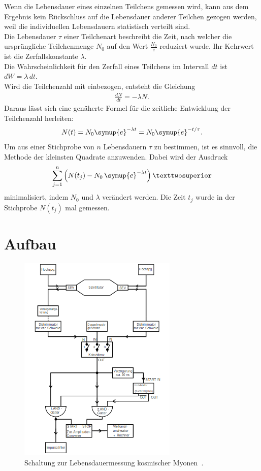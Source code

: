     Wenn die Lebensdauer eines einzelnen Teilchens gemessen wird,
    kann aus dem Ergebnis kein Rückschluss auf die Lebensdauer
    anderer Teilchen gezogen werden, weil die individuellen Lebensdauern
    statistisch verteilt sind. \\
    Die Lebensdauer $\tau$ einer Teilchenart beschreibt die Zeit, nach welcher
    die ursprüngliche Teilchenmenge $N_0$ auf den Wert $\frac{N_0}e$ reduziert
    wurde. Ihr Kehrwert ist die Zerfallskonstante $\lambda.$\\
    Die Wahrscheinlichkeit für den Zerfall eines Teilchens im Intervall $dt$ ist
    $dW=\lambda\,dt.$\\
    Wird die Teilchenzahl mit einbezogen, entsteht die Gleichung
    \begin{align*}
      \frac{dN}{dt}=-\lambda N.
    \end{align*}
    Daraus lässt sich eine genäherte Formel für die zeitliche Entwicklung der
    Teilchenzahl herleiten:
    \begin{align*}
      N(t)=N_0\symup{e}^{-\lambda t}=N_0\symup{e}^{-t/\tau}.
    \end{align*}
    Um aus einer Stichprobe von $n$ Lebensdauern $\tau$ zu bestimmen,
    ist es sinnvoll, die Methode der kleinsten Quadrate anzuwenden.
    Dabei wird der Ausdruck
    \begin{align*}
      \sum_{j=1}^n \left(N(t_j)-N_0\,\symup{e}^{-\lambda t}\right)²
    \end{align*}
    minimalisiert, indem $N_0$ und $\lambda$ verändert werden.
    Die Zeit $t_j$ wurde in der Stichprobe $N(t_j)$ mal gemessen.



  \section{Aufbau}

    \begin{figure}[H]
      \centering
      \includegraphics[height=10cm]{myonaufbau.png}
      \caption{Schaltung zur Lebensdauermessung kosmischer Myonen~\cite{anleitung}.}
      \label{fig:schaltung}
    \end{figure}


